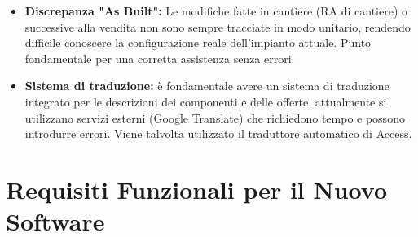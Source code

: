 \documentclass[12pt, a4paper]{article} %
\begin{document}
\begin{itemize}
            Serve un sistema di tracciamento delle sostituzioni e obsolescenze (Es: Fusion).
      \item \textbf{Discrepanza "As Built":} Le modifiche fatte in cantiere (RA di cantiere) o successive alla vendita non sono sempre tracciate in modo unitario, rendendo difficile conoscere la configurazione reale dell'impianto attuale.
            Punto fondamentale per una corretta assistenza senza errori.
      \item \textbf{Sistema di traduzione:} è fondamentale avere un sistema di traduzione integrato per le descrizioni dei componenti e delle offerte,
            attualmente si utilizzano servizi esterni (Google Translate) che richiedono tempo e possono introdurre errori.
            Viene talvolta utilizzato il traduttore automatico di Access.
\end{itemize}

\section{Requisiti Funzionali per il Nuovo Software}
\end{document}
